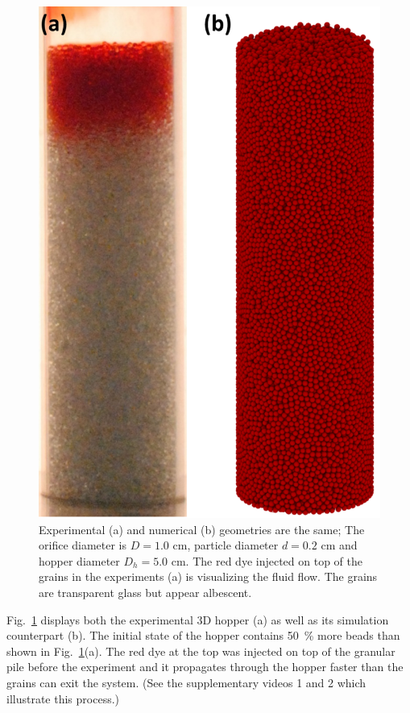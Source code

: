 \documentclass[twoside,twocolumn,9pt]{article}
\providecommand{\DIFadd}[1]{{\protect\color{blue}\uwave{#1}}} %
\providecommand{\DIFaddbegin}{} %
\providecommand{\DIFaddend}{} %
\providecommand{\DIFdelend}{} %
\newcommand{\DIFaddincludegraphics}[2][]{{\color{blue}\fbox{\DIFOincludegraphics[#1]{#2}}}} %
\DeclareRobustCommand{\DIFaddbegin}{\DIFOaddbegin \let\includegraphics\DIFaddincludegraphics} %
\DeclareRobustCommand{\DIFaddend}{\DIFOaddend \let\includegraphics\DIFOincludegraphics} %
\DeclareRobustCommand{\DIFdelend}{\DIFOaddend \let\includegraphics\DIFOincludegraphics} %
\begin{document}


\DIFdelend %
\DIFaddbegin \begin{figure}
\includegraphics[width=\columnwidth]{fig2-snapshot_exp_sim.png}
\caption{Experimental (a) and numerical (b) geometries are the same; The orifice diameter is $D=1.0$ cm, particle diameter $d=0.2$ cm and hopper diameter $D_h=5.0$ cm. The red dye injected on top of the grains in the experiments (a) is visualizing the fluid flow. The grains are transparent glass but appear albescent.
\label{fig:Geometry}}
\end{figure}
\DIFaddend Fig.~\ref{fig:Geometry} displays both the experimental 3D hopper (a) as well as its simulation counterpart (b). The initial state of the \DIFaddbegin \DIFadd{experimental }\DIFaddend hopper contains 50~\% more beads than shown in Fig.~\ref{fig:Geometry}(a). The red dye at the top was injected on top of the granular pile before the experiment and it propagates through the hopper faster than the grains can exit the system. (See the supplementary videos 1 and 2 which illustrate this process.)
\end{document}
